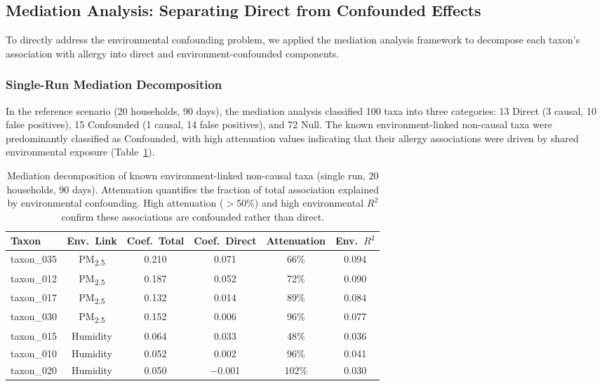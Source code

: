 \documentclass[11pt,letterpaper]{article}
\begin{document}
\subsection{Mediation Analysis: Separating Direct from Confounded Effects}

To directly address the environmental confounding problem, we applied the mediation analysis framework to decompose each taxon's association with allergy into direct and environment-confounded components.

\subsubsection{Single-Run Mediation Decomposition}

In the reference scenario (20 households, 90 days), the mediation analysis classified 100 taxa into three categories: 13 Direct (3 causal, 10 false positives), 15 Confounded (1 causal, 14 false positives), and 72 Null. The known environment-linked non-causal taxa were predominantly classified as Confounded, with high attenuation values indicating that their allergy associations were driven by shared environmental exposure (Table~\ref{tab:mediation_confounded}).

\begin{table}[H]
\centering
\caption{Mediation decomposition of known environment-linked non-causal taxa (single run, 20 households, 90 days). Attenuation quantifies the fraction of total association explained by environmental confounding. High attenuation ($>$50\%) and high environmental $R^2$ confirm these associations are confounded rather than direct.}
\label{tab:mediation_confounded}
\begin{tabular}{@{}lccccc@{}}
\toprule
Taxon & Env.\ Link & Coef.\ Total & Coef.\ Direct & Attenuation & Env.\ $R^2$ \\
\midrule
taxon\_035 & PM\textsubscript{2.5} & 0.210 & 0.071 & 66\% & 0.094 \\
taxon\_012 & PM\textsubscript{2.5} & 0.187 & 0.052 & 72\% & 0.090 \\
taxon\_017 & PM\textsubscript{2.5} & 0.132 & 0.014 & 89\% & 0.084 \\
taxon\_030 & PM\textsubscript{2.5} & 0.152 & 0.006 & 96\% & 0.077 \\
taxon\_015 & Humidity  & 0.064 & 0.033 & 48\% & 0.036 \\
taxon\_010 & Humidity  & 0.052 & 0.002 & 96\% & 0.041 \\
taxon\_020 & Humidity  & 0.050 & $-$0.001 & 102\% & 0.030 \\
\bottomrule
\end{tabular}
\end{table}
\end{document}
